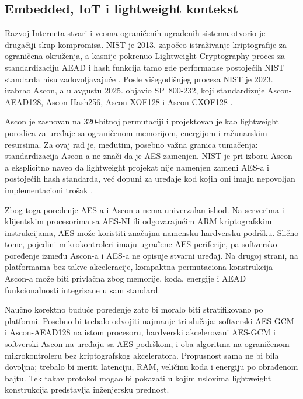 \subsection{Embedded, IoT i lightweight kontekst}

Razvoj Interneta stvari i veoma ograničenih ugrađenih sistema otvorio je
drugačiji skup kompromisa. NIST je 2013. započeo istraživanje kriptografije
za ograničena okruženja, a kasnije pokrenuo Lightweight Cryptography
proces za standardizaciju AEAD i hash funkcija tamo gde performanse
postojećih NIST standarda nisu zadovoljavajuće
\cite{NISTLightweightProject}. Posle višegodišnjeg procesa NIST je 2023.
izabrao Ascon, a u avgustu 2025. objavio SP~800-232, koji standardizuje
Ascon-AEAD128, Ascon-Hash256, Ascon-XOF128 i Ascon-CXOF128
\cite{NISTSP800232}.

Ascon je zasnovan na 320-bitnoj permutaciji i projektovan je kao
lightweight porodica za uređaje sa ograničenom memorijom, energijom i
računarskim resursima. Za ovaj rad je, međutim, posebno važna granica
tumačenja: standardizacija Ascon-a ne znači da je AES zamenjen.
NIST je pri izboru Ascon-a eksplicitno naveo da lightweight projekat nije
namenjen zameni AES-a i postojećih hash standarda, već dopuni za uređaje
kod kojih oni imaju nepovoljan implementacioni trošak
\cite{NISTAsconSelection2023}.

Zbog toga poređenje AES-a i Ascon-a nema univerzalan ishod. Na
serverima i klijentskim procesorima sa AES-NI ili odgovarajućim ARM
kriptografskim instrukcijama, AES može koristiti značajnu namensku
hardversku podršku. Slično tome, pojedini mikrokontroleri imaju ugrađene
AES periferije, pa softversko poređenje između Ascon-a i AES-a ne opisuje
stvarni uređaj. Na drugoj strani, na platformama bez takve akceleracije,
kompaktna permutaciona konstrukcija Ascon-a može biti privlačna zbog
memorije, koda, energije i AEAD funkcionalnosti integrisane u sam
standard.

Naučno korektno buduće poređenje zato bi moralo biti stratifikovano po
platformi. Posebno bi trebalo odvojiti najmanje tri slučaja: softverski
AES-GCM i Ascon-AEAD128 na istom procesoru, hardverski akcelerovani
AES-GCM i softverski Ascon na uređaju sa AES podrškom, i oba algoritma
na ograničenom mikrokontroleru bez kriptografskog akceleratora.
Propusnost sama ne bi bila dovoljna; trebalo bi meriti latenciju, RAM,
veličinu koda i energiju po obrađenom bajtu. Tek takav protokol mogao bi
pokazati u kojim uslovima lightweight konstrukcija predstavlja
inženjersku prednost.


